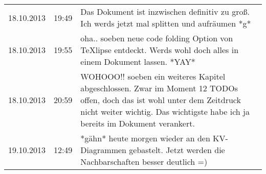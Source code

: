 {\begin{longtable}[t]{rlp{10cm}}
18.10.2013 & 19:49 &
Das Dokument ist inzwischen definitiv zu groß. Ich werds jetzt mal splitten und aufräumen *g*\\
18.10.2013 & 19:55 &
oha.. soeben neue code folding Option von TeXlipse entdeckt. Werds wohl doch alles in einem Dokument lassen. *YAY*\\
18.10.2013 & 20:59 &
WOHOOO!! soeben ein weiteres Kapitel abgeschlossen. Zwar im Moment 12 TODOs offen, doch das ist wohl unter dem Zeitdruck nicht weiter wichtig. Das wichtigste habe ich ja bereits im Dokument verankert.\\
19.10.2013 & 12:49 &
*gähn* heute morgen wieder an den KV-Diagrammen gebastelt. Jetzt werden die Nachbarschaften besser deutlich =) \\
\end{longtable}
}
